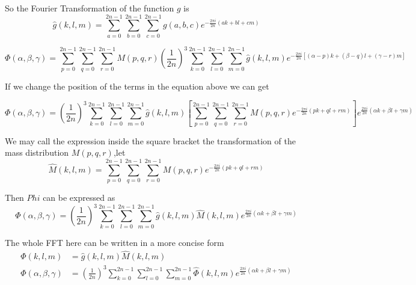 \documentclass[12pt]{article}
\begin{document}
So the Fourier Transformation of the function $g$ is
\begin{equation}
\hat{g}(k,l,m) = \sum_{a=0}^{2n-1} \sum_{b=0}^{2n-1} \sum_{c=0}^{2n-1} g(a,b,c)e^{-\frac{2 \pi i}{2n}(ak+bl+cm)}
\end{equation}

\begin{equation}
\Phi \left(\alpha , \beta , \gamma \right) = \sum_{p=0}^{2n-1} \sum_{q=0}^{2n-1} \sum_{r=0}^{2n-1} M(p,q,r) (\frac{1}{2n})^3   
\sum_{k=0}^{2n-1} \sum_{l=0}^{2n-1} \sum_{m=0}^{2n-1} \hat{g}(k,l,m)e^{-\frac{2 \pi i}{2n}\left[(\alpha-p)k+(\beta - q)l+(\gamma - r)m\right]}
\end{equation}

If we change the position of the terms in the equation above we can get

\begin{equation}
\Phi \left(\alpha , \beta , \gamma \right) = (\frac{1}{2n})^3  \sum_{k=0}^{2n-1} \sum_{l=0}^{2n-1} \sum_{m=0}^{2n-1} \hat{g}(k,l,m)
\left[\sum_{p=0}^{2n-1} \sum_{q=0}^{2n-1} \sum_{r=0}^{2n-1} M(p,q,r)e^{-\frac{2 \pi i}{2n}(pk+ql+rm)} \right] e^{\frac{2 \pi i}{2n}(\alpha k + \beta l + \gamma m)}
\end{equation}

We may call the expression inside the square bracket the transformation of the mass distribution $M(p,q,r)$,let
\begin{equation}
\hat{M}(k,l,m)= \sum_{p=0}^{2n-1} \sum_{q=0}^{2n-1} \sum_{r=0}^{2n-1} M(p,q,r)e^{-\frac{2 \pi i}{2n}(pk+ql+rm)}
\end{equation}

Then $Phi$ can be expressed as
\begin{equation}
\Phi \left(\alpha , \beta , \gamma \right) = (\frac{1}{2n})^3  \sum_{k=0}^{2n-1} \sum_{l=0}^{2n-1} \sum_{m=0}^{2n-1} \hat{g}(k,l,m)
\hat{M}(k,l,m) e^{\frac{2 \pi i}{2n}(\alpha k + \beta l + \gamma m)}
\end{equation}

The whole FFT here can be written in a more concise form
\begin{equation}
\begin{aligned}
\hat{\Phi}(k,l,m) &= \hat{g}(k,l,m) \hat{M}(k,l,m) \\
\Phi(\alpha , \beta , \gamma) &= (\frac{1}{2n})^3 \sum_{k=0}^{2n-1} \sum_{l=0}^{2n-1} \sum_{m=0}^{2n-1} \hat{\Phi}(k,l,m)e^{\frac{2 \pi i}{2n}(\alpha k + \beta l + \gamma m)}
\end{aligned}
\end{equation}
\end{document}
